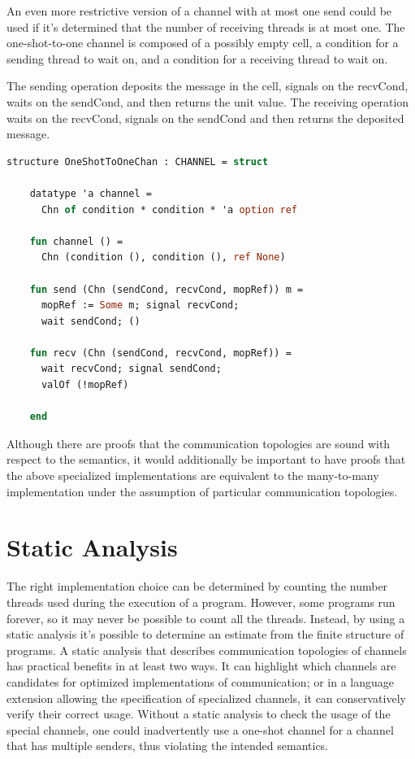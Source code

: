 \documentclass{article}
\begin{document}
An even more restrictive version of a channel with at most one send could be used if it's
determined that the number of receiving threads is at most one.  The one-shot-to-one channel is
composed of a possibly empty cell, a condition for a sending thread to wait on, and a condition
for a receiving thread to wait on.

The sending operation deposits the message in the cell, signals on the recvCond, waits on the
sendCond, and then returns the unit value.  The receiving operation waits on the recvCond, signals
on the sendCond and then returns the deposited message.


\begin{lstlisting}[language=ML, escapechar=\%]
  structure OneShotToOneChan : CHANNEL = struct

    datatype 'a channel =
      Chn of condition * condition * 'a option ref

    fun channel () =
      Chn (condition (), condition (), ref None)

    fun send (Chn (sendCond, recvCond, mopRef)) m =
      mopRef := Some m; signal recvCond;  
      wait sendCond; ()

    fun recv (Chn (sendCond, recvCond, mopRef)) =
      wait recvCond; signal sendCond;
      valOf (!mopRef)

    end
  \end{lstlisting}


Although there are proofs that the communication topologies are sound with respect to the
semantics, it would additionally be important to have proofs that the above specialized
implementations are equivalent to the many-to-many implementation under the assumption of
particular communication topologies.

\section{Static Analysis}
The right implementation choice can be determined by counting the number threads used during
the execution of a program. However, some programs run forever, so it may never be possible to
count all the threads. Instead, by using a static analysis it's possible to determine an
estimate from the finite structure of programs. A static analysis that describes communication
topologies of channels has practical benefits in at least two ways.  It can highlight which
channels are candidates for optimized implementations of communication; or in a language
extension allowing the specification of specialized channels, it can conservatively verify
their correct usage. Without a static analysis to check the usage of the special channels, one
could inadvertently use a one-shot channel for a channel that has multiple senders, thus
violating the intended semantics. 
\end{document}
